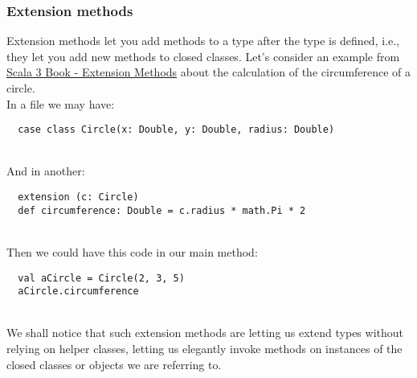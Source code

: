 \subsubsection{Extension methods}
Extension methods let you add methods to a type after the type is defined, i.e., they let you add new methods to closed classes.
Let's consider an example from \href{https://docs.scala-lang.org/scala3/book/ca-extension-methods.html}{Scala 3 Book - Extension Methods} about the calculation of the circumference of a circle.\\
In a file we may have:
\begin{verbatim}
  case class Circle(x: Double, y: Double, radius: Double)
\end{verbatim}\mbox{}\\
And in another:
\begin{verbatim}
  extension (c: Circle)
  def circumference: Double = c.radius * math.Pi * 2
\end{verbatim}\mbox{}\\
Then we could have this code in our main method:
\begin{verbatim}
  val aCircle = Circle(2, 3, 5)
  aCircle.circumference
\end{verbatim}\mbox{}\\
We shall notice that such extension methods are letting us extend types without relying on helper classes, letting us elegantly invoke methods on instances of the closed classes or objects we are referring to.


